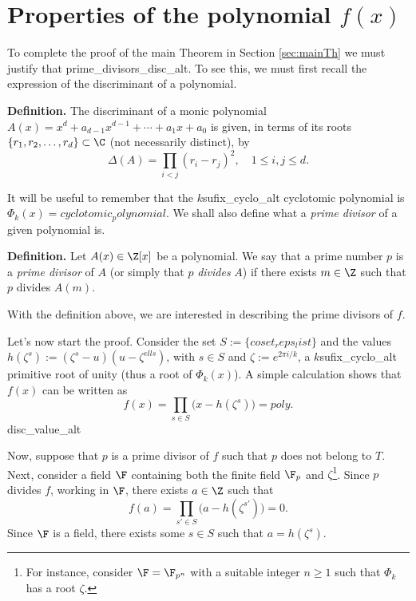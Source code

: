 \section{Properties of the polynomial \texorpdfstring{$f(x)$}{fx}}\label{sec:properties}
 
To complete the proof of the main Theorem in Section \ref{sec:mainTh} we must justify that {prime_divisors_disc_alt}. To see this, we must first recall the expression of the discriminant of a polynomial.

\textbf{Definition.} The discriminant of a monic polynomial $A(x)=x^d+a_{d-1}x^{d-1}+\cdots+a_1x+a_0$ is given, in terms of its roots $\{r_1,r_2,\dots,r_d\}\subset\C$ (not necessarily distinct), by
\begin{equation}\label{eq:discrim}
	\Delta(A)=\prod_{i<j}(r_i-r_j)^2, \quad 1\leqslant i,j\leqslant d.
\end{equation}

It will be useful to remember that the ${k}${sufix_cyclo_alt} cyclotomic polynomial is $\Phi_{{k}}(x)={cyclotomic_polynomial}$. We shall also define what a \emph{prime divisor} of a given polynomial is. 

\textbf{Definition.} Let $A(x)\in\Z[x]$ be a polynomial. We say that a prime number $p$ is a \emph{prime divisor} of $A$ (or simply that $p$ \emph{divides} $A$) if there exists $m\in\Z$ such that $p$ divides $A(m)$.

With the definition above, we are interested in describing the prime divisors of $f$.

Let's now start the proof. Consider the set $S:=\{{coset_reps_list}\}$ and the values $h(\zeta^{s}):=(\zeta^{s}-{u})({u}-\zeta^{{ell}s})$, with $s\in S$ and $\zeta:=e^{2\pi i/{{k}}}$, a ${k}${sufix_cyclo_alt} primitive root of unity (thus a root of $\Phi_{{k}}(x)$). A simple calculation shows that $f(x)$ can be written as
\begin{equation*}
f(x)=\prod_{s\in S}\big(x-h(\zeta^{s})\big)={poly}.
\end{equation*}
{disc_value_alt}

Now, suppose that $p$ is a prime divisor of $f$ such that $p$ does not belong to $T$. Next, consider a field $\F$ containing both the finite field $\F_p$ and $\zeta$\footnote{For instance, consider $\F=\F_{p^n}$ with a suitable integer $n\geqslant 1$ such that $\Phi_{{k}}$ has a root $\zeta$.}. Since $p$ divides $f$, working in $\F$, there exists $a\in\Z$ such that 
\begin{equation*}
f(a)=\prod_{s'\in S}\big(a-h(\zeta^{s'})\big)=0.
\end{equation*}
Since $\F$ is a field, there exists some $s\in S$ such that $a=h(\zeta^{s})$.

